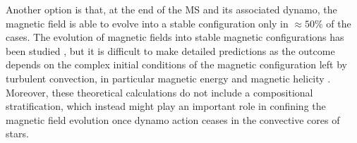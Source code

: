 Another option is that, at the end of the MS and its associated dynamo, the magnetic field is able to evolve into a stable configuration only in $\approx 50\%$ of the cases. The evolution of magnetic fields into stable magnetic configurations has been studied \citep{Braithwaite_2006}, but it is difficult to make detailed predictions as the outcome depends on the complex initial conditions of the magnetic configuration left by turbulent convection, in particular magnetic energy and magnetic helicity \citep{Braithwaite_2008}. Moreover, these theoretical calculations do not include a compositional stratification, which instead might play an important role in confining the magnetic field evolution once dynamo action ceases in the convective cores of stars. 